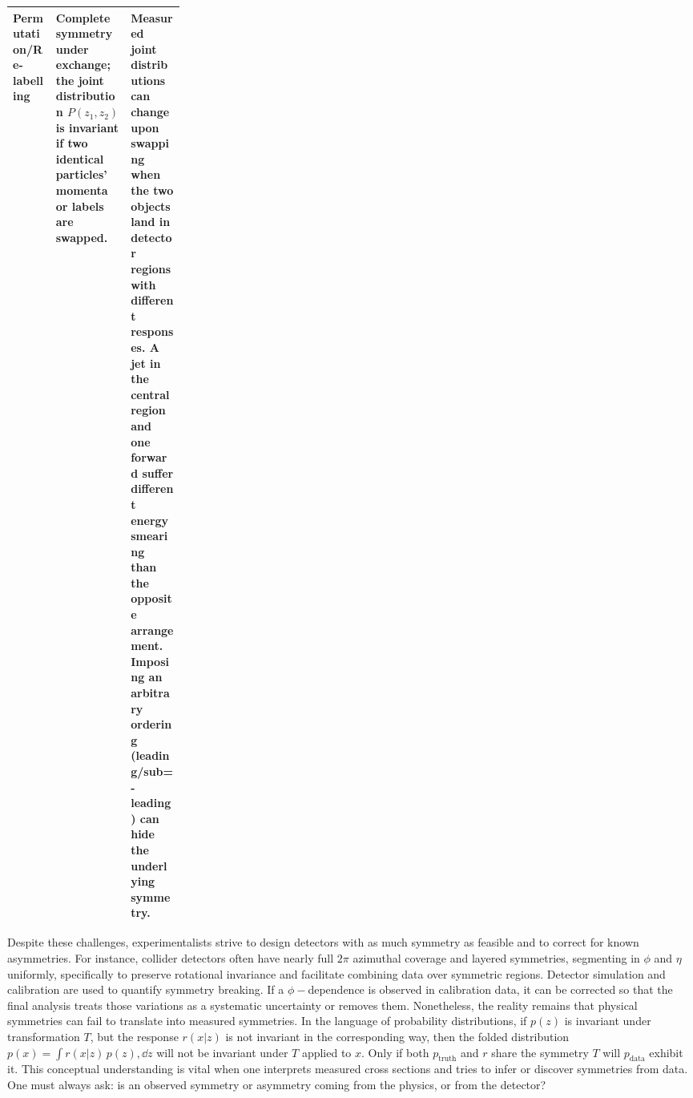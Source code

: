 \begin{table}
\begin{tabularx}{\linewidth}{>{\raggedright\arraybackslash}p{0.25\linewidth} X X}
                Permutation/Re-labelling&
                    Complete symmetry under exchange;
                    the joint distribution $P(z_1,z_2)$ is invariant if two identical particles' momenta or labels are swapped. &
                    Measured joint distributions can change upon swapping when the two objects land in detector regions with different responses.
                    A jet in the central region and one forward suffer different energy smearing than the opposite arrangement.
                    Imposing an arbitrary ordering (leading/sub=-leading) can hide the underlying symmetry.\\
                \bottomrule
            \end{tabularx}
        \end{table}
        Despite these challenges, experimentalists strive to design detectors with as much symmetry as feasible and to correct for known asymmetries.
        For instance, collider detectors often have nearly full $2\pi$ azimuthal coverage and layered symmetries, segmenting in $\phi$ and $\eta$ uniformly, specifically to preserve rotational invariance and facilitate combining data over symmetric regions.
        Detector simulation and calibration are used to quantify symmetry breaking.
        If a $\phi-$dependence is observed in calibration data, it can be corrected so that the final analysis treats those variations as a systematic uncertainty or removes them.
        Nonetheless, the reality remains that physical symmetries can fail to translate into measured symmetries.
        In the language of probability distributions, if $p(z)$ is invariant under transformation $T$, but the response $r(x|z)$ is not invariant in the corresponding way, then the folded distribution $p(x) = \int r(x|z)\,p(z),\dd z$ will not be invariant under $T$ applied to $x$.
        Only if both $p_{\text{truth}}$ and $r$ share the symmetry $T$ will $p_{\text{data}}$ exhibit it.
        This conceptual understanding is vital when one interprets measured cross sections and tries to infer or discover symmetries from data.
        One must always ask: is an observed symmetry or asymmetry coming from the physics, or from the detector?

